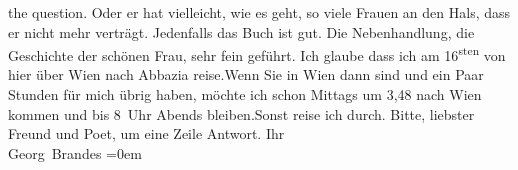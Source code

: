 \begin{ledgroupsized}[t]{13cm}
{                        the question}{}\label{K_L01116_1h}. Oder er
                    hat vielleicht, wie es geht, so viele Frauen an den Hals, dass er nicht mehr
                    verträgt. Jedenfalls {\pb}das Buch ist gut. Die
                    Nebenhandlung, die Geschichte der schönen Frau, sehr fein geführt.\pend
           \pstart
           Ich glaube dass ich am 16\textsuperscript{sten} von hier über Wien nach Abbazia reise.\hspace*{1.5em}Wenn Sie in Wien dann sind
                    und ein Paar Stunden für mich übrig haben, möchte ich schon Mittags um
                        3,48 nach Wien kommen und bis
                        8 Uhr Abends bleiben.\hspace*{1.5em}Sonst
                    reise ich durch.\pend
           \pstart
           Bitte, liebster Freund und Poet, um eine Zeile Antwort.\pend
           \pstart
           Ihr{\\[\baselineskip]}\spacefill\mbox{Georg Brandes}\pend
           \leftskip=0em{}
         
         \endnumbering{}\end{ledgroupsized}  \newcommand{\dateiname}{L01116}\newcommand{\titel}{Georg Brandes an Arthur Schnitzler, 10. 5. [1901]}\newcommand{\editorInnen}{Martin Anton Müller und Gerd-Hermann Susen}
      